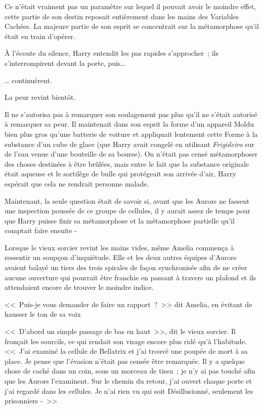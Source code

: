 Ce n'était vraiment pas un paramètre sur lequel il pouvait avoir le moindre effet, cette partie de son destin reposait entièrement dans les mains des Variables Cachées. La majeure partie de son esprit se concentrait sur la métamorphose qu'il était en train d'opérer.

À l'écoute du silence, Harry entendit les pas rapides s'approcher~; ils s'interrompirent devant la porte, puis…

… continuèrent.

La peur revint bientôt.

Il ne s'autorisa pas à remarquer son soulagement pas plus qu'il ne s'était autorisé à remarquer sa peur. Il maintenait dans son esprit la forme d'un appareil Moldu bien plus gros qu'une batterie de voiture et appliquait lentement cette Forme à la substance d'un cube de glace (que Harry avait congelé en utilisant \emph{Frigideiro} sur de l'eau venue d'une bouteille de sa bourse). On n'était pas censé métamorphoser des choses destinées à être brûlées, mais entre le fait que la substance originale était aqueuse et le sortilège de bulle qui protégeait son arrivée d'air, Harry espérait que cela ne rendrait personne malade.

Maintenant, la seule question était de savoir si, avant que les Aurors ne fassent une inspection poussée de ce groupe de cellules, il y aurait assez de temps pour que Harry puisse finir sa métamorphose et la métamorphose partielle qu'il comptait faire ensuite -

\later

Lorsque le vieux sorcier revint les mains vides, même Amelia commença à ressentir un soupçon d'inquiétude. Elle et les deux autres équipes d'Aurors avaient balayé un tiers des trois spirales de façon synchronisée afin de ne créer aucune ouverture qui pourrait être franchie en passant à travers un plafond et ils attendaient encore de trouver le moindre indice.

<<~Puis-je vous demander de faire un rapport~?~>> dit Amelia, en évitant de hausser le ton de sa voix

<<~D'abord un simple passage de bas en haut~>>, dit le vieux sorcier. Il fronçait les sourcils, ce qui rendait son visage encore plus ridé qu'à l'habitude. <<~J'ai examiné la cellule de Bellatrix et j'ai trouvé une poupée de mort à sa place. Je pense que l'évasion n'était pas censée être remarquée. Il y a quelque chose de caché dans un coin, sous un morceau de tissu~; je n'y ai pas touché afin que les Aurors l'examinent. Sur le chemin du retour, j'ai ouvert chaque porte et j'ai regardé dans les cellules. Je n'ai rien vu qui soit Désillusionné, seulement les prisonniers -~>>

